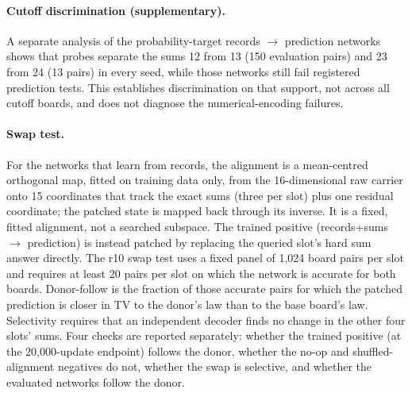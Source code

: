 \paragraph{Cutoff discrimination (supplementary).} A separate analysis of
the probability-target records $\to$ prediction networks shows that probes
separate the sums 12 from 13 (150 evaluation pairs) and 23 from 24 (13
pairs) in every seed, while those networks still fail registered prediction
tests. This establishes discrimination on that support, not across all
cutoff boards, and does not diagnose the numerical-encoding failures.

\paragraph{Swap test.} For the networks that learn from records, the
alignment is a mean-centred orthogonal map, fitted on training data only,
from the 16-dimensional raw carrier onto 15 coordinates that
track the exact sums (three per slot) plus one residual coordinate; the
patched state is mapped back through its inverse. It is a fixed, fitted
alignment, not a searched subspace. The trained positive (records+sums
$\to$ prediction) is instead patched by replacing the queried slot's hard
sum answer directly. The r10 swap test uses a fixed panel of 1,024 board
pairs per slot and requires at least 20 pairs per slot on which the network
is accurate for both boards. Donor-follow is the fraction of those accurate
pairs for which the patched prediction is closer in TV to the donor's law
than to the base board's law. Selectivity requires that an independent
decoder finds no change in the other four slots' sums. Four checks are
reported separately: whether the trained positive (at the 20,000-update
endpoint) follows the donor, whether the no-op and shuffled-alignment
negatives do not, whether the swap is selective, and whether the evaluated
networks follow the donor.
